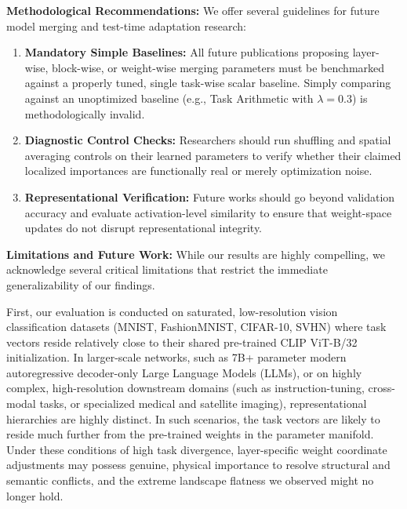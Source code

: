 \textbf{Methodological Recommendations:} We offer several guidelines for future model merging and test-time adaptation research:
\begin{enumerate}
    \item \textbf{Mandatory Simple Baselines:} All future publications proposing layer-wise, block-wise, or weight-wise merging parameters must be benchmarked against a properly tuned, single task-wise scalar baseline. Simply comparing against an unoptimized baseline (e.g., Task Arithmetic with $\lambda=0.3$) is methodologically invalid.
    \item \textbf{Diagnostic Control Checks:} Researchers should run shuffling and spatial averaging controls on their learned parameters to verify whether their claimed localized importances are functionally real or merely optimization noise.
    \item \textbf{Representational Verification:} Future works should go beyond validation accuracy and evaluate activation-level similarity to ensure that weight-space updates do not disrupt representational integrity.
\end{enumerate}

\textbf{Limitations and Future Work:} While our results are highly compelling, we acknowledge several critical limitations that restrict the immediate generalizability of our findings. 

First, our evaluation is conducted on saturated, low-resolution vision classification datasets (MNIST, FashionMNIST, CIFAR-10, SVHN) where task vectors reside relatively close to their shared pre-trained CLIP ViT-B/32 initialization. In larger-scale networks, such as 7B+ parameter modern autoregressive decoder-only Large Language Models (LLMs), or on highly complex, high-resolution downstream domains (such as instruction-tuning, cross-modal tasks, or specialized medical and satellite imaging), representational hierarchies are highly distinct. In such scenarios, the task vectors are likely to reside much further from the pre-trained weights in the parameter manifold. Under these conditions of high task divergence, layer-specific weight coordinate adjustments may possess genuine, physical importance to resolve structural and semantic conflicts, and the extreme landscape flatness we observed might no longer hold.

